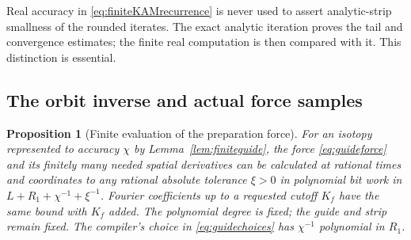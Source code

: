 \documentclass[11pt,a4paper]{amsart}
\newtheorem{proposition}[theorem]{Proposition}
\theoremstyle{definition}
\theoremstyle{remark}
\numberwithin{equation}{section}
\begin{document}
Real accuracy in \eqref{eq:finiteKAMrecurrence} is never used to assert analytic-strip smallness of the rounded iterates. The exact analytic iteration proves the tail and convergence estimates; the finite real computation is then compared with it. This distinction is essential.

\subsection{The orbit inverse and actual force samples}
\begin{proposition}[Finite evaluation of the preparation force]\label{prop:finiteforce}
For an isotopy represented to accuracy $\chi$ by Lemma~\ref{lem:finiteguide}, the force \eqref{eq:guideforce} and its finitely many needed spatial derivatives can be calculated at rational times and coordinates to any rational absolute tolerance $\xi>0$ in polynomial bit work in $L+R_1+\chi^{-1}+\xi^{-1}$. Fourier coefficients up to a requested cutoff $K_f$ have the same bound with $K_f$ added. The polynomial degree is fixed; the guide and strip remain fixed. The compiler's choice in \eqref{eq:guidechoices} has $\chi^{-1}$ polynomial in $R_1$.
\end{proposition}
\end{document}
